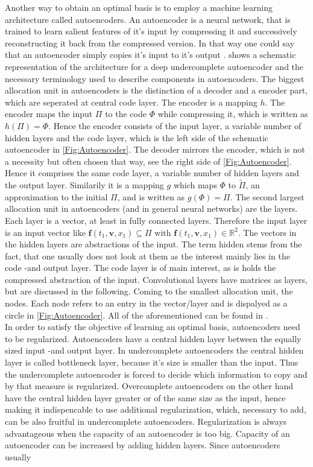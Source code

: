 Another way to obtain an optimal basis is to employ a machine learning architecture called autoencoders. An autoencoder is a neural network, that is trained to learn salient features of it's input by compressing it and successively reconstructing it back from the compressed version. In that way one could say that an autoencoder simply copies it's input to it's output \cite{Goodfellow}.  shows a schematic representation of the architecture for a deep undercomplete autoencoder and the necessary terminology used to describe components in autoencoders. The biggest allocation unit in autoencoders is the distinction of a decoder and a encoder part, which are seperated at central code layer. The encoder is a mapping \(h\). The encoder maps the input \(\Pi\) to the code \(\Phi\) while compressing it, which is written as \(h(\Pi)=\Phi\). Hence the encoder consists of the input layer, a variable number of hidden layers and the code layer, which is the left side of the schematic autoencoder in \cref{Fig:Autoencoder}. The decoder mirrors the encoder, which is not a necessity but often chosen that way, see the right side of \cref{Fig:Autoencoder}. Hence it comprises the same code layer, a variable number of hidden layers and the output layer. Similarily it is a mapping \(g\) which maps \(\Phi\) to \(\tilde{\Pi}\), an approximation to the initial \(\Pi\), and is written as \(g(\Phi)=\Pi\). The second largest allocation unit in autoencoders (and in general neural networks) are the layers. Each layer is a vector, at least in fully connected layers. Therefore the input layer is an input vector like \(\mathbf{f}(t_1,\mathbf{v},x_1)\subseteq \Pi\) with \(\mathbf{f}(t_1,\mathbf{v},x_1) \in \mathbb{R}^2\). The vectors in the hidden layers are abstractions of the input. The term hidden stems from the fact, that one usually does not look at them as the interest mainly lies in the code -and output layer. The code layer is of main interest, as is holds the compressed abstraction of the input.  Convolutional layers have matrices as layers, but are discussed in the following. Coming to the smallest allocation unit, the nodes. Each node refers to an entry in the vector/layer and is dispalyed as a circle in \cref{Fig:Autoencoder}. All of the aforementioned can be found in \cite{Goodfellow}.\\
In order to satisfy the objective of learning an optimal basis, autoencoders need to be regularized. Autoencoders have a central hidden layer between the equally sized input -and output layer. In undercomplete autoencoders the central hidden layer is called bottleneck layer, because it's size is smaller than the input. Thus the undercomplete autoencoder is forced to decide which information to copy and by that measure is regularized. Overcomplete autoencoders on the other hand have the central hidden layer greater or of the same size as the input, hence making it indispencable to use additional regularization, which, necessary to add, can be also fruitful in undercomplete autoencoders. Regularization is always advantageous when the capacity of an autoencoder is too big. Capacity of an autoencoder can be increased by adding hidden layers. Since autoencoders usually   \\

